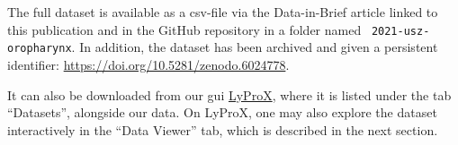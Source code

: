 \begin{tcolorbox}[
    title=\faIcon{database} Data,
    parbox=false,
    float
]
    The full dataset is available as a \acrshort{csv}-file via the Data-in-Brief article linked to this publication \cite{ludwig_dataset_2021} and in the GitHub repository  in a folder named ~\texttt{2021-usz-oropharynx}. In addition, the dataset has been archived and given a persistent identifier: \url{https://doi.org/10.5281/zenodo.6024778}.

    It can also be downloaded from our \gls{gui} \href{https://lyprox.org}{ LyProX}, where it is listed under the tab ``Datasets'', alongside our data. On LyProX, one may also explore the dataset interactively in the ``Data Viewer'' tab, which is described in the next section.
\end{tcolorbox}